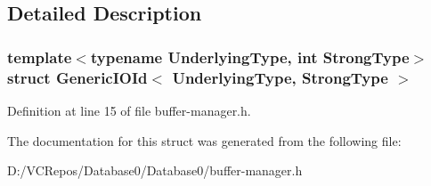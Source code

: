 \subsection{Detailed Description}
\subsubsection*{template$<$typename Underlying\+Type, int Strong\+Type$>$\newline
struct Generic\+I\+O\+Id$<$ Underlying\+Type, Strong\+Type $>$}



Definition at line 15 of file buffer-\/manager.\+h.



The documentation for this struct was generated from the following file\+:\begin{DoxyCompactItemize}
\item 
D\+:/\+V\+C\+Repos/\+Database0/\+Database0/buffer-\/manager.\+h\end{DoxyCompactItemize}
